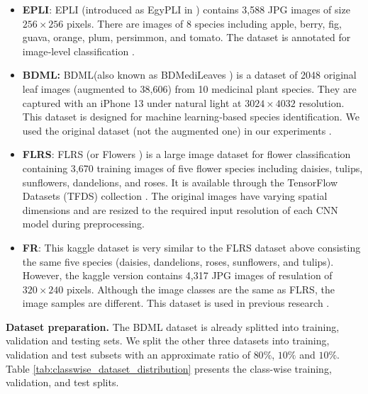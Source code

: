 \documentclass[a4paper,fleqn]{cas-dc}
\begin{document}
	\begin{itemize}
		\item \textbf{EPLI}: EPLI (introduced as EgyPLI in \cite{r26}) contains 3,588 JPG images of size $256\times256$ pixels.  
		There are images of 8 species including apple, berry, fig, guava, orange, plum, persimmon, and tomato. 
		The dataset is annotated for image‑level classification  \cite{r26}.
		
		\item \textbf{BDML:} BDML(also known as BDMediLeaves \cite{r29}) is a dataset of 2048 original leaf images (augmented to 38,606) from 10 medicinal plant species. 
		They are captured with an iPhone 13 under natural light at $3024\times 4032$ resolution. 
		This dataset is designed for machine learning‑based species identification. We used the original dataset (not the augmented one) in our experiments \cite{r29}.
		
		\item \textbf{FLRS}: FLRS (or Flowers \cite{r30}) is a large image dataset for flower classification containing 3,670 training images of five flower species including daisies, tulips, sunflowers, dandelions, and roses. 
		It is available through the TensorFlow Datasets (TFDS) collection \cite{r30}. 
        The original images have varying spatial dimensions and are resized to the required input resolution of each CNN model during preprocessing.
		
		\item \textbf{FR}:  This kaggle \cite{r31} dataset is very similar to the FLRS dataset above  consisting the same five species (daisies, dandelions, roses, sunflowers, and tulips). 
		However, the kaggle version contains 4,317 JPG images of resulation of $320\times240$ pixels. 
		Although the image classes are the same as FLRS, the image samples are different. 
		This dataset is used in previous research \cite {r32, r33}.
	\end{itemize}
	
	
	\noindent
	\textbf{Dataset preparation.} 
	The BDML dataset is already splitted into training, validation and testing sets. 
	We split the other three datasets into training, validation and test subsets with an approximate ratio of $80\%$, $10\%$ and $10\%$. 
	Table \ref{tab:classwise_dataset_distribution} presents the class-wise training, validation, and test splits. 
		
\end{document}
